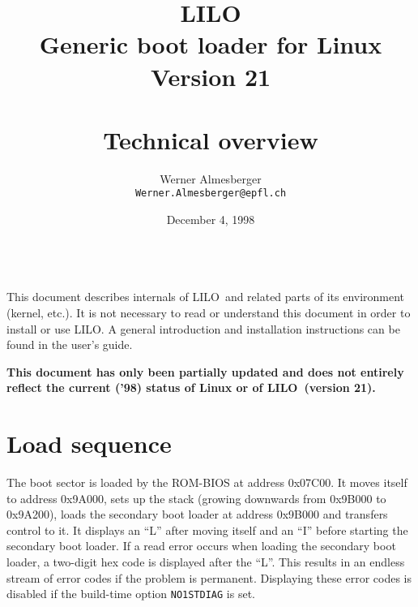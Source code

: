 %
%
%


\parindent=0pt
\parskip=4pt


\def\key#1{$[$#1$]$}
\def\LILO{LILO}

\def\SetFigFont#1#2#3{\tt}




\title{\LILO \\
  \Large
  Generic boot loader for Linux \\
  Version 21 \\ ~\\
  \bf Technical overview}
\author{Werner Almesberger \\
  {\tt Werner.Almesberger@epfl.ch}}
\date{December 4, 1998}

\maketitle
{
  \parskip=-4pt
  \setcounter{tocdepth}{1}
  \tableofcontents
}

~\\
This document describes internals of \LILO\ and related parts of its
environment (kernel, etc.). It is not necessary to read or understand
this document in order to install or use \LILO. A general introduction
and installation instructions can be found in the user's guide.

{\bf This document has only been partially updated and does not entirely
reflect the current ('98) status of Linux or of \LILO\ (version 21).}


\section{Load sequence}
\label{load}

The boot sector is loaded by the ROM-BIOS at address 0x07C00. It moves
itself to address 0x9A000, sets up the stack (growing downwards from
0x9B000 to 0x9A200), loads the secondary boot loader at address
0x9B000 and transfers control to it. It displays an ``L'' after moving
itself and an ``I'' before starting the secondary boot loader. If a read
error occurs when loading the secondary boot loader, a two-digit hex code
is displayed after the ``L''. This results in an endless stream of error
codes if the problem is permanent. Displaying these error codes is disabled
if the build-time option {\tt NO1STDIAG} is set.

